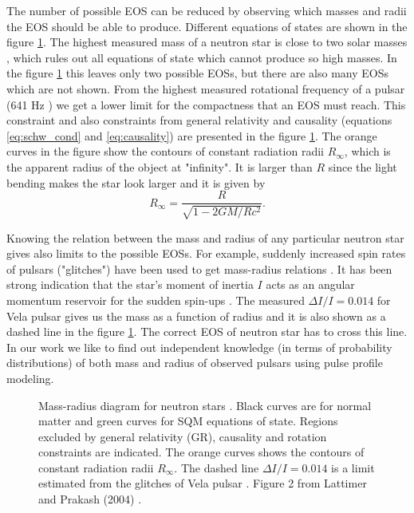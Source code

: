 \documentclass{wihuri}
\def\be{\begin{equation}}
\def\ee{\end{equation}}
\begin{document}
The number of possible EOS can be reduced by observing which masses and radii the EOS should be able to produce. Different equations of states are shown in the figure \ref{fig:eos_mr}. The highest measured mass of a neutron star is close to two solar masses \cite{demorest}, which rules out all equations of state which cannot produce so high masses. In the figure \ref{fig:eos_mr} this leaves only two possible EOSs, but there are also many EOSs which are not shown. From the highest measured rotational frequency of a pulsar (641 Hz \cite{lattimer}) we get a lower limit for the compactness that an EOS must reach. This constraint and also constraints from general relativity and causality (equations \ref{eq:schw_cond} and \ref{eq:causality}) are presented in the figure \ref{fig:eos_mr}. The orange curves in the figure show the contours of constant radiation radii $R_{\infty}$, which is the apparent radius of the object at "infinity". It is larger than $R$ since the light bending makes the star look larger and it is given by \cite{lattimer2001}
\be \label{eq:rinfty}
R_{\infty} = \frac{R}{\sqrt{1-2GM/Rc^{2}}}.
\ee  

Knowing the relation between the mass and radius of any particular neutron star gives also limits to the possible EOSs. For example, suddenly increased spin rates of pulsars ("glitches") have been used to get mass-radius relations \cite{lattimer2001}. It has been strong indication that the star's moment of inertia $I$ acts as an angular momentum reservoir for the sudden spin-ups \cite{link1999}. The measured $\Delta I / I = 0.014$  for Vela pulsar gives us the mass as a function of radius and it is also shown as a dashed line in the figure \ref{fig:eos_mr}. The correct EOS of neutron star has to cross this line. In our work we like to find out independent knowledge (in terms of probability distributions) of both mass and radius of observed pulsars using pulse profile modeling. 




 
\begin{figure}
\centerline{} 
\caption{Mass-radius diagram for neutron stars \cite{lattimer}. Black curves are for normal matter and green curves for SQM equations of state. Regions excluded by general relativity (GR), causality and rotation constraints are indicated. The orange curves shows the contours of constant radiation radii $R_{\infty}$. The dashed line $\Delta I / I = 0.014$ is a limit estimated from the glitches of Vela pulsar \cite{lattimer2001}. Figure 2 from Lattimer and Prakash (2004) \cite{lattimer}.}  
\label{fig:eos_mr}
\end{figure}
\end{document}
